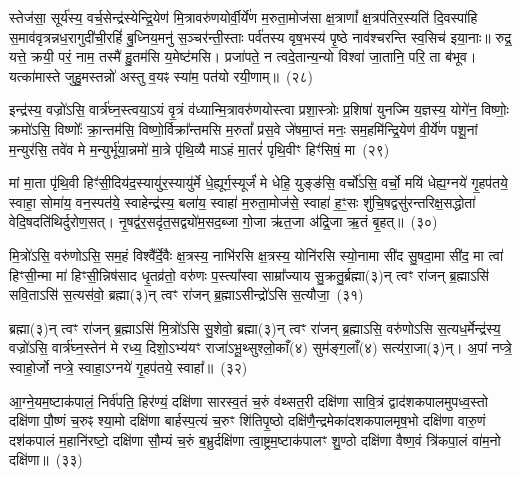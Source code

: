 स्तेज॑सा॒ सूर्य॑स्य॒ वर्च॒सेन्द्र॑स्येन्द्रि॒येण॑ मि॒त्रावरु॑णयोर्वी॒र्ये॑ण म॒रुता॒\-मोज॑सा क्ष॒त्राणां᳚ क्ष॒त्रप॑तिर॒स्यति॑ दि॒वस्पा॑हि स॒माव॑वृत्रन्नध॒रा\-गुदी॑ची॒\-रहिं॑ बु॒ध्निय॒मनु॑ स॒ञ्चर॑न्ती॒स्ताः पर्व॑तस्य वृष॒भस्य॑ पृ॒ष्ठे नाव॑श्चरन्ति स्व॒सिच॑ इया॒नाः॥ रुद्र॒ यत्ते॒ क्रयी॒ परं॒ नाम॒ तस्मै॑ हु॒तम॑सि य॒मेष्ट॑मसि। प्रजा॑पते॒ न त्वदे॒तान्य॒न्यो विश्वा॑ जा॒तानि॒ परि॒ ता ब॑भूव। यत्का॑मास्ते जुहु॒मस्तन्नो॑ अस्तु व॒यꣴ स्या॑म॒ पत॑यो रयी॒णाम्॥~(२८)

{\anuvakamend[{अ॒ग्नेस्तैका॑\-दश च}]}%

इन्द्र॑स्य॒ वज्रो॑\-ऽसि॒ वार्त्र॑घ्न॒स्त्वया॒\-ऽयं वृ॒त्रं व॑ध्यान्मि॒त्रावरु॑ण\-योस्त्वा प्रशा॒स्त्रोः प्र॒शिषा॑ युनज्मि य॒ज्ञस्य॒ योगे॑न॒ विष्णोः॒ क्रमो॑\-ऽसि॒ विष्णोः᳚ क्रा॒न्तम॑सि॒ विष्णो॒र्विक्रा᳚न्तमसि म॒रुतां᳚ प्रस॒वे जे॑षमा॒प्तं मनः॒ सम॒हमि॑न्द्रि॒येण॑ वी॒र्ये॑ण पशू॒नां म॒न्युर॑सि॒ तवे॑व मे म॒न्युर्भू॑या॒न्नमो॑ मा॒त्रे पृ॑थि॒व्यै मा\-ऽहं मा॒तरं॑ पृथि॒वीꣳ हिꣳ॑सिषं॒ मा~(२९)

मां मा॒ता पृ॑थि॒वी हिꣳ॑सी॒दिय॑द॒स्यायु॑र॒स्यायु॑र्मे धे॒ह्यूर्ग॒स्यूर्जं॑ मे धेहि॒ युङ्ङ॑सि॒ वर्चो॑\-ऽसि॒ वर्चो॒ मयि॑ धेह्य॒ग्नये॑ गृ॒हप॑तये॒ स्वाहा॒ सोमा॑य॒ वन॒स्पत॑ये॒ स्वाहेन्द्र॑स्य॒ बला॑य॒ स्वाहा॑ म॒रुता॒मोज॑से॒ स्वाहा॑ ह॒ꣳ॒सः शु॑चि॒षद्वसु॑रन्तरिक्ष॒\-सद्धोता॑ वेदि॒षदति॑थिर्दुरोण॒सत्। नृ॒षद्व॑र॒सदृ॑त॒सद्व्यो॑म॒सद॒ब्जा गो॒जा ऋ॑त॒जा अ॑द्रि॒जा ऋ॒तं बृ॒हत्॥~(३०)

{\anuvakamend[{हि॒ꣳ॒सि॒षं॒ मर्त॒जास्त्रीणि॑ च}]}%

मि॒त्रो॑\-ऽसि॒ वरु॑णो\-ऽसि॒ सम॒हं विश्वै᳚र्दे॒वैः क्ष॒त्रस्य॒ नाभि॑रसि क्ष॒त्रस्य॒ योनि॑रसि स्यो॒नामा सी॑द सु॒षदा॒मा सी॑द॒ मा त्वा॑ हिꣳसी॒न्मा मा॑ हिꣳसी॒न्निष॑साद धृ॒तव्र॑तो॒ वरु॑णः प॒स्त्या᳚स्वा साम्रा᳚ज्याय सु॒क्रतु॒र्ब्रह्मा(३)न् त्वꣳ रा॑जन् ब्र॒ह्मा\-ऽसि॑ सवि॒ता\-ऽसि॑ स॒त्यस॑वो॒ ब्रह्मा(३)न् त्वꣳ रा॑जन् ब्र॒ह्मा\-ऽसीन्द्रो॑\-ऽसि स॒त्यौजा॒~(३१)

ब्रह्मा(३)न् त्वꣳ रा॑जन् ब्र॒ह्मा\-ऽसि॑ मि॒त्रो॑\-ऽसि सु॒शेवो॒ ब्रह्मा(३)न् त्वꣳ रा॑जन् ब्र॒ह्मा\-ऽसि॒ वरु॑णो\-ऽसि स॒त्यध॒र्मेन्द्र॑स्य॒ वज्रो॑\-ऽसि॒ वार्त्र॑घ्न॒स्तेन॑ मे रध्य॒ दिशो॒\-ऽभ्य॑यꣳ राजा॑\-ऽभू॒थ्सुश्लो॒काँ(४) सुम॑ङ्ग॒लाँ(४) सत्य॑रा॒जा(३)न्। अ॒पां नप्त्रे॒ स्वाहो॒र्जो नप्त्रे॒ स्वाहा॒\-ऽग्नये॑ गृ॒हप॑तये॒ स्वाहा᳚॥~(३२)

{\anuvakamend[{स॒त्यौजा᳚श्चत्वारि॒ꣳ॒शच्च॑}]}%

आ॒ग्ने॒यम॒ष्टा\-क॑पालं॒ निर्व॑पति॒ हिर॑ण्यं॒ दक्षि॑णा सारस्व॒तं च॒रुं व॑थ्सत॒री दक्षि॑णा सावि॒त्रं द्वाद॑श\-कपालमुपध्व॒स्तो दक्षि॑णा पौ॒ष्णं च॒रुꣴ श्या॒मो दक्षि॑णा बार्\mbox{}हस्प॒त्यं च॒रुꣳ शि॑तिपृ॒ष्ठो दक्षि॑णै॒न्द्रमेका॑\-दश\-कपालमृष॒भो दक्षि॑णा वारु॒णं दश॑\-कपालं म॒हानि॑रष्टो॒ दक्षि॑णा सौ॒म्यं च॒रुं ब॒भ्रुर्दक्षि॑णा त्वा॒ष्ट्रम॒ष्टाक॑पालꣳ शु॒ण्ठो दक्षि॑णा वैष्ण॒वं त्रि॑कपा॒लं वा॑म॒नो दक्षि॑णा॥~(३३)

